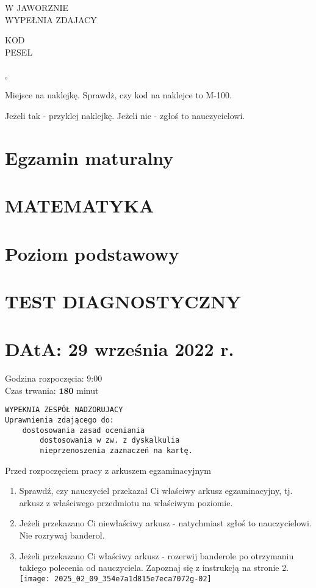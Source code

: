 \documentclass[10pt]{article}
\author{Liczba punktów do uzyskania: 46}
\date{}
\begin{document}
\maketitle
W JAWORZNIE\\
WYPEŁNIA ZDAJACY

KOD\\
PESEL

\begin{center}
\begin{tabular}{|l|l|}
\hline
 &  \\
\hline
\end{tabular}
\end{center} \(\square\)

Miejsce na naklejkę. Sprawdż, czy kod na naklejce to M-100.

Jeżeli tak - przyklej naklejkę. Jeżeli nie - zgłoś to nauczycielowi.

\section*{Egzamin maturalny}
\section*{MATEMATYKA}
\section*{Poziom podstawowy}
\section*{TEST DIAGNOSTYCZNY}
\section*{DAtA: 29 września 2022 r.}
Godzina rozpoczęcia: 9:00\\
Czas trwania: \(\mathbf{1 8 0}\) minut

\begin{verbatim}
WYPEKNIA ZESPÓŁ NADZORUJACY
Uprawnienia zdającego do:
    dostosowania zasad oceniania
        dostosowania w zw. z dyskalkulia
        nieprzenoszenia zaznaczeń na kartę.
\end{verbatim}

Przed rozpoczęciem pracy z arkuszem egzaminacyjnym

\begin{enumerate}
  \item Sprawdź, czy nauczyciel przekazał Ci właściwy arkusz egzaminacyjny, tj. arkusz z właściwego przedmiotu na właściwym poziomie.
  \item Jeżeli przekazano Ci niewłaściwy arkusz - natychmiast zgłoś to nauczycielowi. Nie rozrywaj banderol.
  \item Jeżeli przekazano Ci właściwy arkusz - rozerwij banderole po otrzymaniu takiego polecenia od nauczyciela. Zapoznaj się z instrukcją na stronie 2.\\
\texttt{[image: 2025\_02\_09\_354e7a1d815e7eca7072g-02]}
\end{enumerate}
\end{document}
